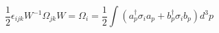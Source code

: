 \begin{equation}
\frac{1}{2} \epsilon_{ijk} W^{-1} \Omega_{jk}  W = \Omega_{i} = \frac{1}{2} 
\int (a_{p}^{\dag} \sigma_{i} a_{p} + b_{p}^{\dag} \sigma_{i} b_{p})d^{3}p 
\end{equation}


